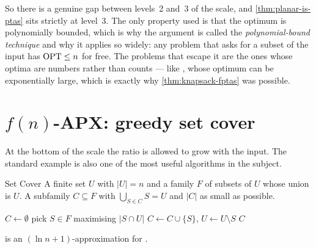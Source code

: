 So there is a genuine gap between levels~2 and~3 of the scale, and
\cref{thm:planar-is-ptas} sits strictly at level~3. The only property used is
that the optimum is polynomially bounded, which is why the argument is called
the \emph{polynomial-bound technique} and why it applies so widely: any problem
that asks for a subset of the input has $\mathrm{OPT} \le n$ for free. The problems that
escape it are the ones whose optima are numbers rather than counts --- like
, whose optimum can be exponentially large, which is exactly why
\cref{thm:knapsack-fptas} was possible.

\section{\texorpdfstring{$f(n)$}{f(n)}-APX: greedy set cover}
\label{sec:set-cover}

At the bottom of the scale the ratio is allowed to grow with the input. The
standard example is also one of the most useful algorithms in the subject.

\begin{probdef}{Set Cover}
  \instance A finite set $U$ with $|U| = n$ and a family $F$ of subsets of $U$
  whose union is $U$.
  \question A subfamily $C \subseteq F$ with $\bigcup_{S \in C} S = U$ and
  $|C|$ as small as possible.
\end{probdef}

\begin{algorithm}[ht]
\caption{Greedy }
\label{alg:greedy-set-cover}
\begin{algorithmic}[1]
  \State $C \gets \emptyset$
    \State pick $S \in F$ maximising $|S \cap U|$
    \State $C \gets C \cup \{S\}$, \quad $U \gets U \setminus S$
  \EndWhile
  \State \Return $C$
\end{algorithmic}
\end{algorithm}

\begin{theorem}\label{thm:greedy-set-cover}
 is an $(\ln n + 1)$-approximation for
.
\end{theorem}

